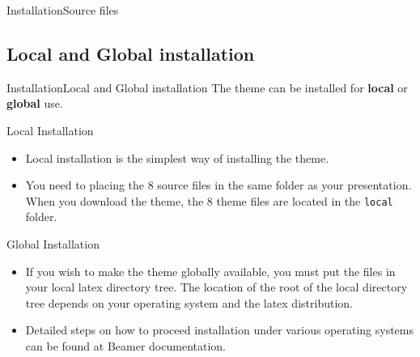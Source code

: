 \documentclass[10pt,xcolor={dvipsnames},aspectratio=169]{beamer}
\begin{document}
\begin{frame}{Installation}{Source files}
\end{frame}

\subsection{Local and Global installation}
\begin{frame}{Installation}{Local and Global installation}
  The theme can be installed for \textbf{local} or \textbf{global} use.
  \begin{block}{Local Installation}
    \small \begin{itemize}    
      \item Local installation is the simplest way of installing the theme. 
      \item You need to placing the 8 source files in the same folder as your presentation. When you download the theme, the 8 theme files are located in the {\tt local} folder.
    \end{itemize}
  \end{block}
  \begin{block}{Global Installation}
    \small \begin{itemize}
      \item If you wish to make the theme globally available, you must put the files in your local latex directory tree. The location of the root of the local directory tree depends on your operating system and the latex distribution. 
      \item Detailed steps on how to proceed installation under various operating systems can be found at Beamer documentation.
    \end{itemize}
  \end{block}
\end{frame}
     

\end{document}
